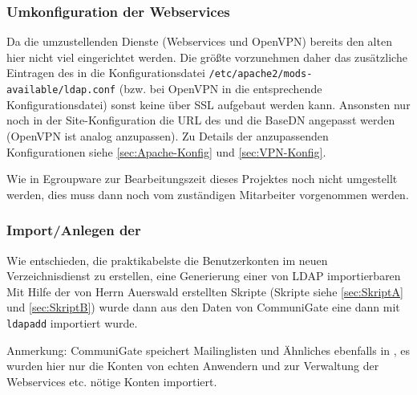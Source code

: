 \documentclass[11pt,a4paper,titlepage=firstiscover]{scrartcl} %
\begin{document}
\subsubsection{Umkonfiguration der Webservices}
Da die umzustellenden Dienste (Webservices und OpenVPN) bereits den alten 
  hier nicht viel eingerichtet werden. 
Die größte  vorzunehmen  daher das zusätzliche 
Eintragen des  in die Konfigurationsdatei 
\texttt{/etc/apache2/mods-available/ldap.conf} (bzw. bei OpenVPN in die 
entsprechende Konfigurationsdatei)  sonst keine  
über SSL aufgebaut werden kann. Ansonsten  nur noch in 
der Site-Konfiguration die URL des  und die BaseDN angepasst 
werden (OpenVPN ist analog anzupassen). Zu Details der anzupassenden 
Konfigurationen siehe \autoref{sec:Apache-Konfig} und \autoref{sec:VPN-Konfig}.

Wie in   Egroupware zur 
Bearbeitungszeit dieses Projektes noch nicht umgestellt werden, dies muss dann 
noch vom zuständigen Mitarbeiter vorgenommen werden.

\subsubsection{Import/Anlegen der }
Wie   entschieden,  die 
praktikabelste  die Benutzerkonten im neuen Verzeichnisdienst 
zu erstellen, eine Generierung einer von LDAP importierbaren 
Mit Hilfe der von Herrn Auerswald erstellten Skripte (Skripte siehe 
\autoref{sec:SkriptA} und \autoref{sec:SkriptB}) wurde dann aus den Daten von 
CommuniGate eine   dann mit \texttt{ldapadd} 
importiert wurde.

Anmerkung: CommuniGate speichert Mailinglisten und Ähnliches ebenfalls in 
, es wurden hier nur die Konten von echten Anwendern und zur 
Verwaltung der Webservices etc. nötige Konten importiert.
\end{document}
